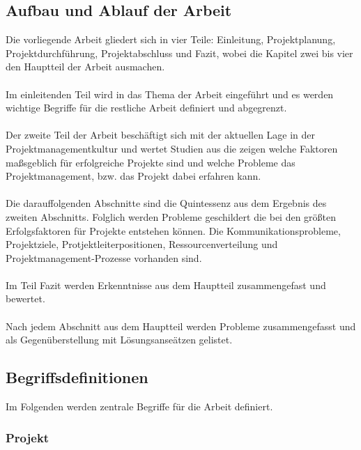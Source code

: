\documentclass[12pt]{scrartcl}
\begin{document}
\subsection{Aufbau und Ablauf der Arbeit}
Die vorliegende Arbeit gliedert sich in vier Teile: Einleitung, Projektplanung, Projektdurchführung, Projektabschluss und Fazit, wobei die Kapitel zwei bis vier den Hauptteil der Arbeit ausmachen. 
\\ \\
Im einleitenden Teil wird in das Thema der Arbeit eingeführt und es werden wichtige Begriffe für die restliche Arbeit definiert und abgegrenzt.  
\\ \\
Der zweite Teil der Arbeit beschäftigt sich mit der aktuellen Lage in der Projektmanagementkultur und wertet Studien aus die zeigen welche Faktoren maßsgeblich für erfolgreiche Projekte sind und welche Probleme das Projektmanagement, bzw. das Projekt dabei erfahren kann. 
\\ \\
Die darauffolgenden Abschnitte sind die Quintessenz aus dem Ergebnis des zweiten Abschnitts. Folglich werden Probleme geschildert die bei den größten Erfolgsfaktoren für Projekte entstehen können. Die Kommunikationsprobleme, Projektziele, Protjektleiterpositionen, Ressourcenverteilung und Projektmanagement-Prozesse vorhanden sind. 
\\ \\
Im Teil Fazit werden Erkenntnisse aus dem Hauptteil zusammengefast und bewertet.
\\ \\
Nach jedem Abschnitt aus dem Hauptteil werden Probleme zusammengefasst und als Gegenüberstellung mit Lösungsanseätzen gelistet. 
\subsection{Begriffsdefinitionen}

Im Folgenden werden zentrale Begriffe für die Arbeit definiert. 

\subsubsection{Projekt}
\end{document}
